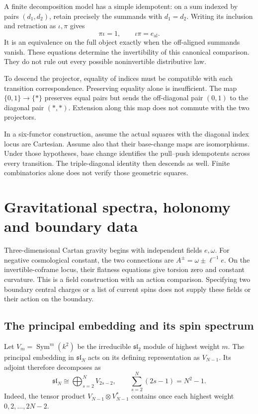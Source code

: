 A finite decomposition model has a simple idempotent:
on a sum indexed by pairs $(d_1,d_2)$, retain precisely the
summands with $d_1=d_2$.
Writing its inclusion and retraction as $\iota,\pi$ gives
\[
 \pi\iota=1,\qquad \iota\pi=e_{\mathrm{al}}.
\]
It is an equivalence on the full object exactly when the
off-aligned summands vanish.
These equations determine the invertibility of this canonical
comparison. They do not rule out every possible noninvertible
distributive law.

To descend the projector, equality of indices must be compatible
with each transition correspondence.
Preserving equality alone is insufficient.
The map $\{0,1\}\to\{*\}$ preserves equal pairs but sends the
off-diagonal pair $(0,1)$ to the diagonal pair $(*,*)$.
Extension along this map does not commute with the two projectors.

In a six-functor construction, assume the actual squares with the
diagonal index locus are Cartesian.
Assume also that their base-change maps are isomorphisms.
Under those hypotheses, base change identifies the pull--push
idempotents across every transition. The triple-diagonal identity
then descends as well.
Finite combinatorics alone does not verify those geometric squares.

\section{Gravitational spectra, holonomy and boundary data}

Three-dimensional Cartan gravity begins with independent fields
$e,\omega$.
For negative cosmological constant, the two connections are
$A^\pm=\omega\pm\ell^{-1}e$.
On the invertible-coframe locus, their flatness equations give
torsion zero and constant curvature.
This is a field construction with an action comparison.
Specifying two boundary central charges or a list of current spins
does not supply these fields or their action on the boundary.

\subsection{The principal embedding and its spin spectrum}

Let $V_m=\operatorname{Sym}^m(k^2)$ be the irreducible
$\mathfrak{sl}_2$ module of highest weight $m$.
The principal embedding in $\mathfrak{sl}_N$ acts on its defining
representation as $V_{N-1}$.
Its adjoint therefore decomposes as
\begin{equation}\label{eq:vol2-principal-spectrum}
 \mathfrak{sl}_N
 \cong\bigoplus_{s=2}^{N}V_{2s-2},\qquad
 \sum_{s=2}^{N}(2s-1)=N^2-1.
\end{equation}
Indeed, the tensor product
$V_{N-1}\otimes V_{N-1}^*$ contains once each highest weight
$0,2,\ldots,2N-2$.

